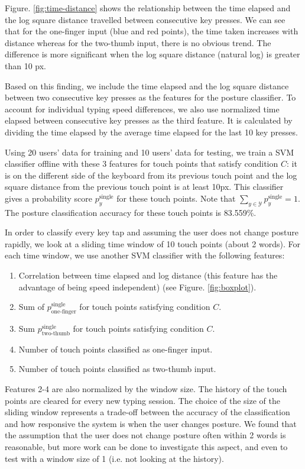 \documentclass{sigchi}
\begin{document}
Figure. \ref{fig:time-distance} shows the relationship between the time elapsed 
and the log square distance travelled between consecutive key presses. We can
see that for the one-finger input (blue and red points), the time taken
increases with distance whereas for the two-thumb input, there is no obvious
trend. The difference is more significant when the log square distance (natural
log) is greater than 10 px.

Based on this finding, we include the time elapsed and the log square distance
between two consecutive key presses as the features for the posture classifier. 
To account for individual typing speed differences, we also use normalized time 
elapsed between consecutive key presses as the third feature. It is calculated 
by dividing the time elapsed by the average time elapsed for the last 10 key
presses.

Using 20 users’ data for training and 10 users’ data for testing, we train a SVM classifier offline with these 3 features for touch points that satisfy condition $C$: it is 
on the different side of the keyboard from its previous touch point and the log square distance from the previous touch point is at least 10px. This classifier gives a probability score $p_y^{\text{single}}$ for these touch points. Note that $\displaystyle\sum_{y \in \mathcal{Y}}p_y^{\text{single}} = 1$. The posture classification accuracy for these touch points is 83.559\%.
 
In order to classify every key tap and assuming the user does not change posture 
rapidly, we look at a sliding time window of 10 touch points (about 2 words). For 
each time window, we use another SVM classifier with the following features:
\begin{enumerate}
\item Correlation between time elapsed and log distance (this feature has the
advantage of being speed independent) (see Figure. \ref{fig:boxplot}).
\item Sum of $p_\text{one-finger}^{\text{single}}$ for touch points satisfying condition $C$.
\item Sum $p_\text{two-thumb}^{\text{single}}$ for touch points satisfying condition $C$.
\item Number of touch points classified as one-finger input.
\item Number of touch points classified as two-thumb input.
\end{enumerate}
Features 2-4 are also normalized by the window size. The history of the touch points are cleared for every new typing session.
The choice of the size of the sliding window represents a trade-off between the 
accuracy of the classification and how responsive the system is when the user
changes posture. We found that the assumption that the user does not change posture
often within 2 words is reasonable, but more work can be done to investigate this
aspect, and even to test with a window size of 1 (i.e. not 
looking at the history).
\end{document}
